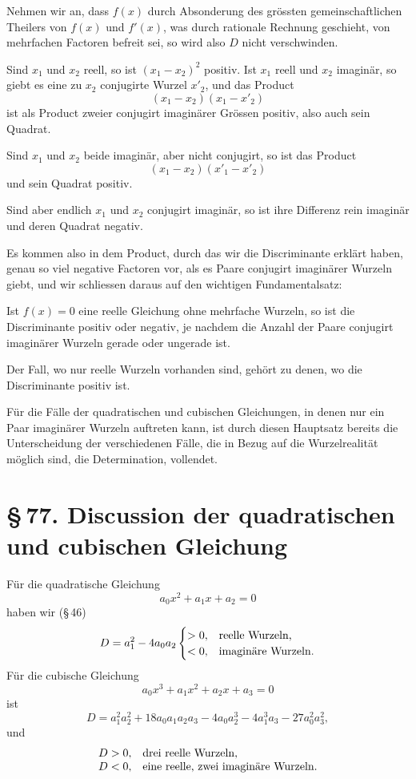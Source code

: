 \documentclass[11pt]{article}
\providecommand{\sect}[2]{\section*{\S\,#1. #2}}
\begin{document}
Nehmen wir an, dass $f(x)$ durch Absonderung des gr\"ossten gemeinschaftlichen Theilers von $f(x)$ und $f'(x)$, was durch rationale Rechnung geschieht, von mehrfachen Factoren befreit sei, so wird also $D$ nicht verschwinden.

Sind $x_1$ und $x_2$ reell, so ist $(x_1-x_2)^2$ positiv. Ist $x_1$ reell und $x_2$ imagin\"ar, so giebt es eine zu $x_2$ conjugirte Wurzel $x'_2$, und das Product
\[
        (x_1-x_2)(x_1-x'_2)
\]
ist als Product zweier conjugirt imagin\"arer Gr\"ossen positiv, also auch sein Quadrat.

Sind $x_1$ und $x_2$ beide imagin\"ar, aber nicht conjugirt, so ist das Product
\[
        (x_1-x_2)(x'_1-x'_2)
\]
und sein Quadrat positiv.

Sind aber endlich $x_1$ und $x_2$ conjugirt imagin\"ar, so ist ihre Differenz rein imagin\"ar und deren Quadrat negativ.

Es kommen also in dem Product, durch das wir die Discriminante erkl\"art haben, genau so viel negative Factoren vor, als es Paare conjugirt imagin\"arer Wurzeln giebt, und wir schliessen daraus auf den wichtigen Fundamentalsatz:

Ist $f(x)=0$ eine reelle Gleichung ohne mehrfache Wurzeln, so ist die Discriminante positiv oder negativ, je nachdem die Anzahl der Paare conjugirt imagin\"arer Wurzeln gerade oder ungerade ist.

Der Fall, wo nur reelle Wurzeln vorhanden sind, geh\"ort zu denen, wo die Discriminante positiv ist.

F\"ur die F\"alle der quadratischen und cubischen Gleichungen, in denen nur ein Paar imagin\"arer Wurzeln auftreten kann, ist durch diesen Hauptsatz bereits die Unterscheidung der verschiedenen F\"alle, die in Bezug auf die Wurzelrealit\"at m\"oglich sind, die Determination, vollendet.

\sect{77}{Discussion der quadratischen und cubischen Gleichung}

F\"ur die quadratische Gleichung
\[
        a_0x^2+a_1x+a_2=0
\]
haben wir (\S\,46)
\[
        D=a_1^2-4a_0a_2
\begin{cases}
>0, & \text{reelle Wurzeln,}\cr
<0, & \text{imagin\"are Wurzeln.}
\end{cases}
\]
F\"ur die cubische Gleichung
\[
        a_0x^3+a_1x^2+a_2x+a_3=0
\]
ist
\[
 D=a_1^2a_2^2+18a_0a_1a_2a_3-4a_0a_2^3-4a_1^3a_3-27a_0^2a_3^2,
\]
und
\[
\begin{array}{ll}
D>0, & \text{drei reelle Wurzeln,}\cr
D<0, & \text{eine reelle, zwei imagin\"are Wurzeln.}
\end{array}
\]
\end{document}
